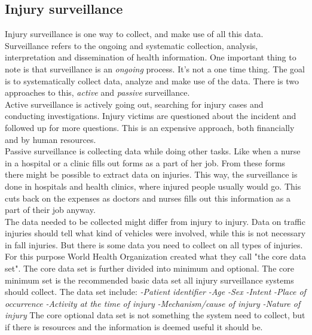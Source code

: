 \documentclass[UKenglish, 12pt]{article}
\newcommand{\WHO}{World Health Organization }
\newcommand{\is}{injury surveillance}
\begin{document}
\subsection*{Injury surveillance}
Injury surveillance is one way to collect, and
make use of all this data.  Surveillance refers to the ongoing and systematic
collection, analysis, interpretation and dissemination of health
information.\cite[11]{who-guide} One important thing to note is that
surveillance is an \textit{ongoing} process.  It's not a one time thing. The
goal is to systematically collect data, analyze and make use of the
data.  There is two approaches to this, \textit{active} and \textit{passive}
surveillance. \\Active surveillance is actively going out, searching for injury
cases and conducting investigations.  Injury victims are questioned about the
incident and followed up for more questions. This is an expensive approach,
both financially and by human resources. \\Passive surveillance is collecting
data while doing other tasks.  Like when a nurse in a hospital or a clinic
fills out forms as a part of her job. From these forms there might be possible
to extract data on injuries. This way, the surveillance is done in hospitals and
health clinics, where injured people usually would go.  This cuts back on the
expenses as doctors and nurses fills out this information as a part of their job
anyway.\\

The data needed to be collected might differ from injury to injury. Data on
traffic injuries should tell what kind of vehicles were involved, while this is
not necessary in fall injuries. But there is some data you need to collect on all
types of injuries. For this purpose \WHO created what they call "the core data
set".\cite[25]{who-guide} The core data set is further divided into minimum and
optional. The core minimum set is the recommended basic data set all \is
systems should collect. The data set include:
\newline \emph{-Patient identifier}
\newline \emph{-Age}
\newline \emph{-Sex}
\newline \emph{-Intent}
\newline \emph{-Place of occurrence}
\newline \emph{-Activity at the time of injury}
\newline \emph{-Mechanism/cause of injury}
\newline \emph{-Nature of injury}
\newline The core optional data set is not something
the system need to collect, but if there is resources and the information is
deemed useful it should be. 
\end{document}
